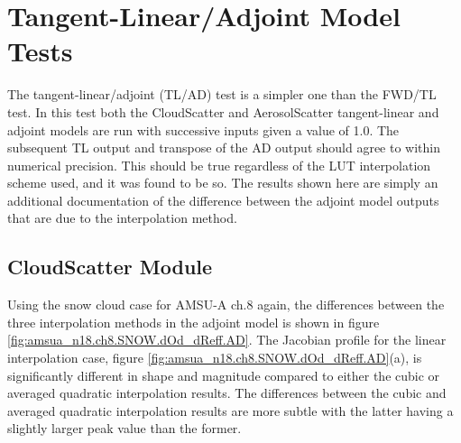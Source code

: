 \section{Tangent-Linear/Adjoint Model Tests}
The tangent-linear/adjoint (TL/AD) test is a simpler one than the FWD/TL test. In this test both the CloudScatter and AerosolScatter tangent-linear and adjoint models are run with successive inputs given a value of 1.0. The subsequent TL output and transpose of the AD output should agree to within numerical precision. This should be true regardless of the LUT interpolation scheme used, and it was found to be so. The results shown here are simply an additional documentation of the difference between the adjoint model outputs that are due to the interpolation method.

\subsection{CloudScatter Module}
Using the snow cloud case for AMSU-A ch.8 again, the differences between the three interpolation methods  in the adjoint model is shown in figure \ref{fig:amsua_n18.ch8.SNOW.dOd_dReff.AD}. The Jacobian profile for the linear interpolation case, figure \ref{fig:amsua_n18.ch8.SNOW.dOd_dReff.AD}(a), is significantly different in shape and magnitude compared to either the cubic or averaged quadratic interpolation results. The differences between the cubic and averaged quadratic interpolation results are more subtle with the latter having a slightly larger peak value than the former.
